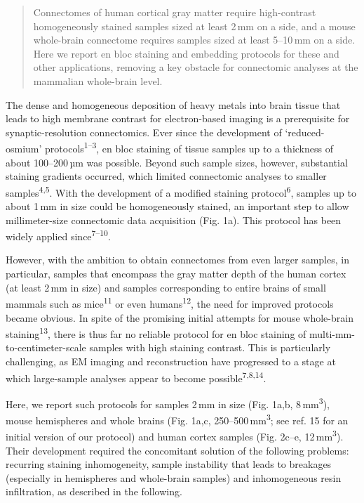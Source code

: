 \documentclass{article}
\begin{document}
\begin{quote}
Connectomes of human cortical gray matter require high-contrast homogeneously stained samples sized at least 2\,mm on a side, and a mouse whole-brain connectome requires samples sized at least 5–10\,mm on a side. Here we report en bloc staining and embedding protocols for these and other applications, removing a key obstacle for connectomic analyses at the mammalian whole-brain level.
\end{quote}

The dense and homogeneous deposition of heavy metals into brain tissue that leads to high membrane contrast for electron-based imaging is a prerequisite for synaptic-resolution connectomics. Ever since the development of ‘reduced-osmium’ protocols\textsuperscript{1–3}, en bloc staining of tissue samples up to a thickness of about 100–200\,µm was possible. Beyond such sample sizes, however, substantial staining gradients occurred, which limited connectomic analyses to smaller samples\textsuperscript{4,5}. With the development of a modified staining protocol\textsuperscript{6}, samples up to about 1\,mm in size could be homogeneously stained, an important step to allow millimeter-size connectomic data acquisition (Fig. 1a). This protocol has been widely applied since\textsuperscript{7–10}.

However, with the ambition to obtain connectomes from even larger samples, in particular, samples that encompass the gray matter depth of the human cortex (at least 2\,mm in size) and samples corresponding to entire brains of small mammals such as mice\textsuperscript{11} or even humans\textsuperscript{12}, the need for improved protocols became obvious. In spite of the promising initial attempts for mouse whole-brain staining\textsuperscript{13}, there is thus far no reliable protocol for en bloc staining of multi-mm-to-centimeter-scale samples with high staining contrast. This is particularly challenging, as EM imaging and reconstruction have progressed to a stage at which large-sample analyses appear to become possible\textsuperscript{7,8,14}.

Here, we report such protocols for samples 2\,mm in size (Fig. 1a,b, 8\,mm\textsuperscript{3}), mouse hemispheres and whole brains (Fig. 1a,c, 250–500\,mm\textsuperscript{3}; see ref. 15 for an initial version of our protocol) and human cortex samples (Fig. 2c–e, 12\,mm\textsuperscript{3}). Their development required the concomitant solution of the following problems: recurring staining inhomogeneity, sample instability that leads to breakages (especially in hemispheres and whole-brain samples) and inhomogeneous resin infiltration, as described in the following.
\end{document}
